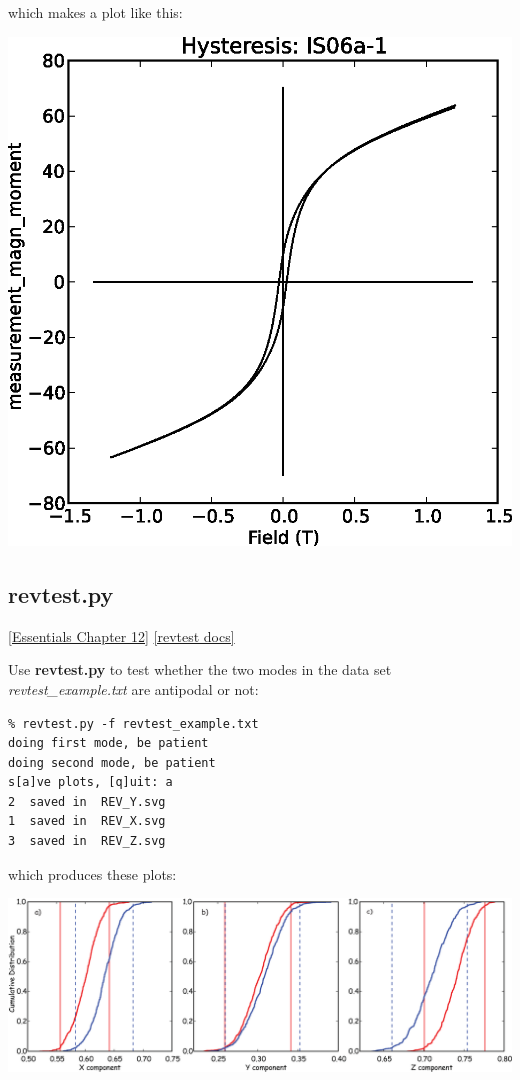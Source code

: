\documentclass[11pt]{book}
\begin{document}
{{which makes a plot like this:

\includegraphics[width=12 cm]{EPSfiles/quick_hyst.eps}


\subsection{revtest.py}
\href{http://earthref.org/MAGIC/books/Tauxe/Essentials/WebBook3ch12.html#ch12}{[Essentials Chapter 12]}
\href{https://github.com/PmagPy/PmagPy/blob/master/programs/revtest.py}{[revtest docs]}

Use {\bf revtest.py} to test whether the two modes in the data set {\it revtest\_example.txt} are antipodal or not:

\begin{verbatim}
% revtest.py -f revtest_example.txt
doing first mode, be patient
doing second mode, be patient
s[a]ve plots, [q]uit: a
2  saved in  REV_Y.svg
1  saved in  REV_X.svg
3  saved in  REV_Z.svg

\end{verbatim}

\noindent which produces these plots:

{ %
\includegraphics[width=15cm]{EPSfiles/revtest.eps}}

}}
\end{document}
